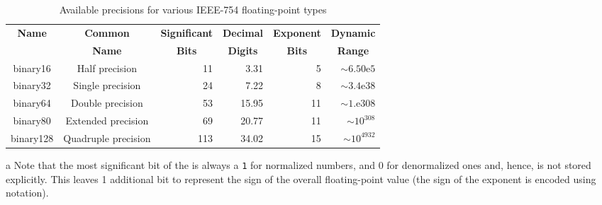 \begin{table}[h!]
\begin{center}
\begin{threeparttable}
\caption{Available precisions for various IEEE-754 floating-point types}\label{digitseparator-table3}\vspace{1.5ex}
{\small \begin{tabular}{c|c|c|c|c|c}\thickhline
\rowcolor[gray]{.9}   {\sffamily\bfseries Name} & {\sffamily\bfseries Common} &
{\sffamily\bfseries Significant } & {\sffamily\bfseries Decimal }& {\sffamily\bfseries Exponent } & {\sffamily\bfseries Dynamic}\\
\rowcolor[gray]{.9}    & {\sffamily\bfseries Name} &
{\sffamily\bfseries Bits\tnote{a}} & {\sffamily\bfseries Digits}& {\sffamily\bfseries Bits} & {\sffamily\bfseries Range}\\ \hline
binary16 & Half precision & \multicolumn{1}{r|}{11} & \multicolumn{1}{r|}{3.31} & \multicolumn{1}{r|}{5} & \multicolumn{1}{r}{$\sim6.50\text{e}5$}\\ \hline
binary32 & Single precision & \multicolumn{1}{r|}{24} & \multicolumn{1}{r|}{7.22} & \multicolumn{1}{r|}{8} & \multicolumn{1}{r}{$\sim3.4\text{e}38$}\\ \hline
binary64 & Double precision & \multicolumn{1}{r|}{53} & \multicolumn{1}{r|}{15.95} & \multicolumn{1}{r|}{11} & \multicolumn{1}{r}{$\sim1.\text{e}308$}\\ \hline
\rule{0pt}{3.5mm}binary80 & Extended precision & \multicolumn{1}{r|}{69} & \multicolumn{1}{r|}{20.77} & \multicolumn{1}{r|}{11} & \multicolumn{1}{r}{$\sim10^{308}$}\\ \hline
\rule{0pt}{3.5mm}binary128 & Quadruple precision & \multicolumn{1}{r|}{113} & \multicolumn{1}{r|}{34.02} & \multicolumn{1}{r|}{15} & \multicolumn{1}{r}{$\sim10^{4932}$}\\ \hline
\end{tabular}
} %
\begin{tablenotes}{\footnotesize
\item[a]{Note that the most significant bit of the 
is always a \lstinline!1! for normalized numbers, and 0 for denormalized ones and, hence, is not stored explicitly. This leaves 1
additional bit to represent the sign of the overall floating-point value
(the sign of the exponent is encoded using 
notation).}
} %
\end{tablenotes} %
\end{threeparttable}
\end{center}
\end{table}

